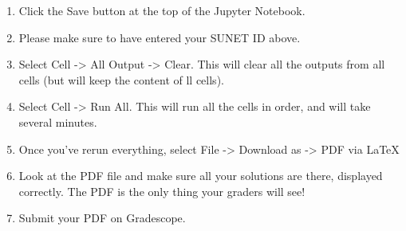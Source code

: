 \documentclass[11pt]{article}
\providecommand{\tightlist}{%
      \setlength{\itemsep}{0pt}\setlength{\parskip}{0pt}}
\begin{document}
\begin{enumerate}
\def\labelenumi{\arabic{enumi}.}
\tightlist
\item
  Click the Save button at the top of the Jupyter Notebook.
\item
  Please make sure to have entered your SUNET ID above.
\item
  Select Cell -\textgreater{} All Output -\textgreater{} Clear. This
  will clear all the outputs from all cells (but will keep the content
  of ll cells).
\item
  Select Cell -\textgreater{} Run All. This will run all the cells in
  order, and will take several minutes.
\item
  Once you've rerun everything, select File -\textgreater{} Download as
  -\textgreater{} PDF via LaTeX
\item
  Look at the PDF file and make sure all your solutions are there,
  displayed correctly. The PDF is the only thing your graders will see!
\item
  Submit your PDF on Gradescope.
\end{enumerate}


    
    
    
    
\end{document}
